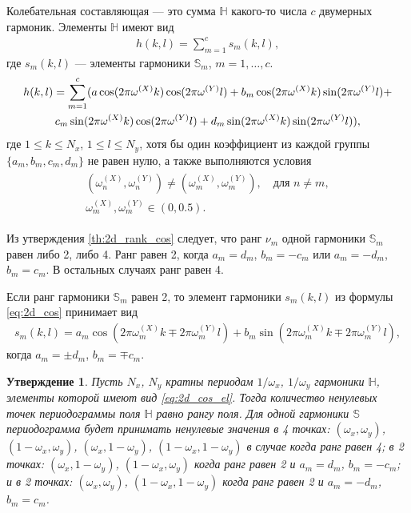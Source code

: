 \documentclass[specialist,
               substylefile = spbu.rtx,
               subf,href,colorlinks=true, 12pt]{disser}
\newtheorem{Th}{Утверждение}
\begin{document}
Колебательная составляющая --- это сумма $\mathbb{H}$ какого-то числа $c$ двумерных гармоник. Элементы $\mathbb{H}$ имеют вид
\begin{gather} \label{eq:2d_cos}
h(k,l) = \sum_{m=1}^{c}{s_m(k,l)},
\end{gather}
где $s_m(k,l)$ --- элементы гармоники $\mathbb{S}_m$, $m=1,\ldots,c$.
\begin{gather}
\notag
h(k,l) = \sum_{m=1}^{c}(a \cos(2\pi \omega^{(X)}k) \cos(2\pi \omega^{(Y)}l) +
b_m \cos(2\pi \omega^{(X)}k) \sin(2\pi \omega^{(Y)}l) + \\ \label{eq:2d_cos_el}
c_m \sin(2\pi \omega^{(X)}k) \cos(2\pi \omega^{(Y)}l) +
d_m \sin(2\pi \omega^{(X)}k) \sin(2\pi \omega^{(Y)}l)),
\end{gather}
где $1 \leqslant k \leqslant N_x$, $1 \leqslant l \leqslant N_y$, хотя бы один коэффициент из каждой группы $\{a_m,b_m,c_m,d_m\}$ не равен нулю, а также выполняются условия
\begin{align} \label{eq:2d_omega}
\begin{matrix}
(\omega_n^{(X)}, \omega_n^{(Y)}) \not = (\omega_m^{(X)}, \omega_m^{(Y)}), \quad \text{для } n \not= m,\\
\omega_m^{(X)}, \omega_m^{(Y)} \in (0,0.5).
\end{matrix}
\end{align}

Из утверждения \ref{th:2d_rank_cos} следует, что ранг $\nu_m$ одной гармоники $\mathbb{S}_m$ равен либо 2, либо 4. Ранг равен 2, когда $a_m = d_m$, $b_m = -c_m$ или $a_m = -d_m$, $b_m = c_m$. В остальных случаях ранг равен 4.

Если ранг гармоники $\mathbb{S}_m$ равен 2, то элемент гармоники $s_m(k,l)$ из формулы \eqref{eq:2d_cos} принимает вид
\begin{gather} \label{eq:2d_cos_rank2}
s_m(k,l)=a_m \cos(2\pi \omega_m^{(X)}k \mp 2\pi \omega_m^{(Y)}l) + b_m \sin(2\pi \omega_m^{(X)}k \mp 2\pi \omega_m^{(Y)}l),
\end{gather}
когда $a_m = \pm d_m$, $b_m = \mp c_m$.

\begin{Th}
Пусть $N_x$, $N_y$ кратны периодам $1/\omega_x$, $1/\omega_y$ гармоники $\mathbb{H}$, элементы которой имеют вид \eqref{eq:2d_cos_el}.
Тогда количество ненулевых точек периодограммы поля $\mathbb{H}$ равно рангу поля. Для одной гармоники $\mathbb{S}$ периодограмма будет принимать ненулевые значения в 4 точках: $(\omega_x, \omega_y)$, $(1-\omega_x, \omega_y)$, $(\omega_x, 1-\omega_y)$, $(1-\omega_x, 1-\omega_y)$ в случае когда ранг равен 4; в 2 точках:  $(\omega_x, 1-\omega_y)$, $(1-\omega_x, \omega_y)$ когда ранг равен 2 и $a_m=d_m$, $b_m = -c_m$; и в 2 точках:  $(\omega_x, \omega_y)$, $(1-\omega_x, 1-\omega_y)$ когда ранг равен 2 и $a_m=-d_m$, $b_m = c_m$.
\end{Th}
\end{document}
